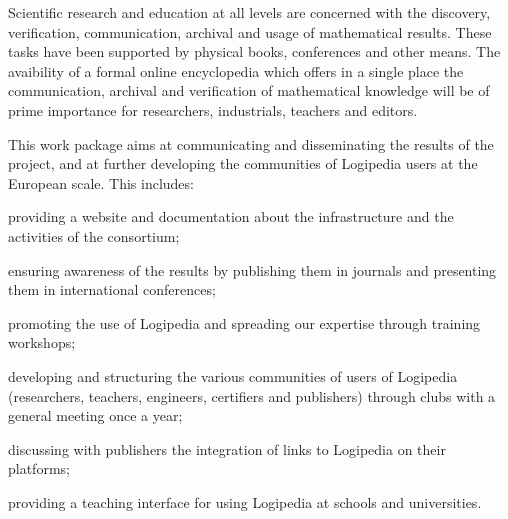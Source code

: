 \begin{workpackage}[id=dissemination,type=MGT,wphases=1-48,
  short={Dissemination},
  title={Dissemination, communication and exploitation},
  lead=Inr,InrRM=12,BirRM=4,InrRM=4,ImtRM=2,StrRM=2,ZibRM=14,EduRM=12]

  \begin{wpobjectives}
    Scientific research and education at all levels are concerned with
    the discovery, verification, communication, archival and usage of
    mathematical results. These tasks have been supported by physical
    books, conferences and other means. The avaibility of a formal
    online encyclopedia which offers in a single place the
    communication, archival and verification of mathematical knowledge
    will be of prime importance for researchers, industrials, teachers
    and editors.

    This work package aims at communicating and disseminating the
    results of the project, and at further developing the communities
    of Logipedia users at the European scale. This includes:
    \begin{compactitem}
    \item providing a website and documentation about the
      infrastructure and the activities of the consortium;
    \item ensuring awareness of the results by publishing them in
      journals and presenting them in international conferences;
    \item promoting the use of Logipedia and spreading our expertise
      through training workshops;
    \item developing and structuring the various communities of users
      of Logipedia (researchers, teachers, engineers, certifiers and
      publishers) through clubs with a general meeting once a year;
    \item discussing with publishers the integration of links to
      Logipedia on their platforms;
    \item providing a teaching interface for using Logipedia at
      schools and universities.
    \end{compactitem}
  \end{wpobjectives}



\end{workpackage}
